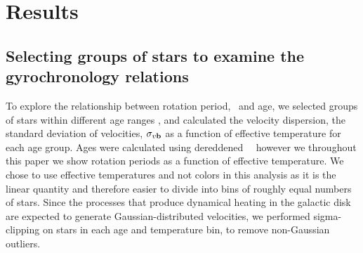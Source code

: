 \section{Results}

\subsection{Selecting groups of stars to examine the gyrochronology relations}

To explore the relationship between rotation period, \teff\ and age, we
selected groups of stars within different age ranges \citep[where age was
calculated using the][gyrochronology relation]{angus2019}, and calculated the
velocity dispersion, the standard deviation of velocities, $\sigma_{v{\bf b}}$
as a function of effective temperature for each age group.
Ages were calculated using dereddened \gaia\ \gcolor\, however we throughout
this paper we show rotation periods as a function of effective temperature.
We chose to use effective temperatures and not colors in this analysis as it
is the linear quantity and therefore easier to divide into bins of roughly
equal numbers of stars.
Since the processes that produce dynamical heating in the galactic disk are
expected to generate Gaussian-distributed velocities, we performed
sigma-clipping on stars in each age and temperature bin, to remove
non-Gaussian outliers.

